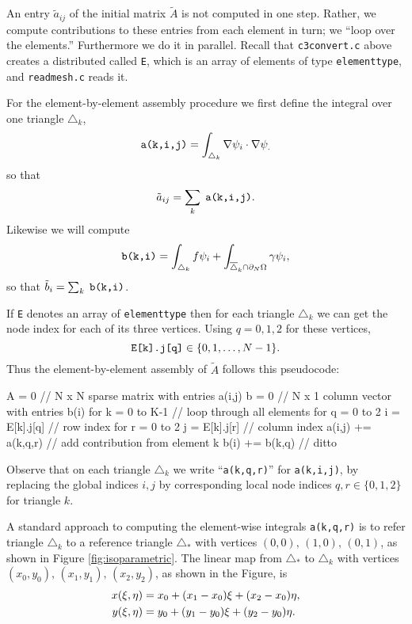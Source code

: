 An entry $\tilde a_{ij}$ of the initial matrix $\tilde A$ is not computed in one step.  Rather, we compute contributions to these entries from each element in turn; we ``loop over the elements.''  Furthermore we do it in parallel.  Recall that \texttt{c3convert.c} above creates a distributed \pVec called \texttt{E}, which is an array of elements of type \texttt{elementtype}, and \texttt{readmesh.c} reads it.

For the element-by-element assembly procedure we first define the integral over one triangle $\triangle_k$,
\begin{equation}
\text{\texttt{a(k,i,j)}} = \int_{\triangle_k} \nabla \psi_i \cdot \nabla \psi_. \label{aelementintegral}
\end{equation}
so that
    $$\tilde a_{ij} = \sum_k \phantom{.}\text{\texttt{a(k,i,j)}}.$$
Likewise we will compute
\begin{equation}
\text{\texttt{b(k,i)}} = \int_{\triangle_k} f \psi_i + \int_{\overline{\triangle}_k \cap \partial_N\Omega} \gamma \psi_i, \label{belementintegral}
\end{equation}
so that $\tilde b_i = \sum_{k} \;\text{\texttt{b(k,i)}}$.

If \texttt{E} denotes an array of \texttt{elementtype} then for each triangle $\triangle_k$ we can get the node index for each of its three vertices.  Using $q=0,1,2$ for these vertices,
    $$\text{\texttt{E[k].j[q]}} \in \{0,1,\dots,N-1\}.$$
Thus the element-by-element assembly of $\tilde A$ follows this pseudocode:
\begin{code}
A = 0                           // N x N sparse matrix with entries a(i,j)
b = 0                           // N x 1 column vector with entries b(i)
for k = 0 to K-1                // loop through all elements
    for q = 0 to 2
        i = E[k].j[q]           // row index
        for r = 0 to 2
            j = E[k].j[r]       // column index
            a(i,j) += a(k,q,r)  // add contribution from element k
            b(i)   += b(k,q)    // ditto
\end{code}
\medskip\noindent
Observe that on each triangle $\triangle_k$ we write ``\texttt{a(k,q,r)}'' for \texttt{a(k,i,j)}, by replacing the global indices $i,j$ by corresponding local node indices $q,r\in\{0,1,2\}$ for triangle $k$.

A standard approach to computing the element-wise integrals \texttt{a(k,q,r)} is to refer triangle $\triangle_k$ to a reference triangle $\triangle_\ast$ with vertices $(0,0),\,(1,0),\,(0,1)$, as shown in Figure \ref{fig:isoparametric}.  The linear map from $\triangle_\ast$ to $\triangle_k$ with vertices $(x_0,y_0),\,(x_1,y_1),\,(x_2,y_2)$, as shown in the Figure, is
\begin{align}
x(\xi,\eta) &= x_0 + (x_1-x_0) \xi + (x_2-x_0) \eta, \label{trianglemap} \\
y(\xi,\eta) &= y_0 + (y_1-y_0) \xi + (y_2-y_0) \eta. \notag
\end{align}

